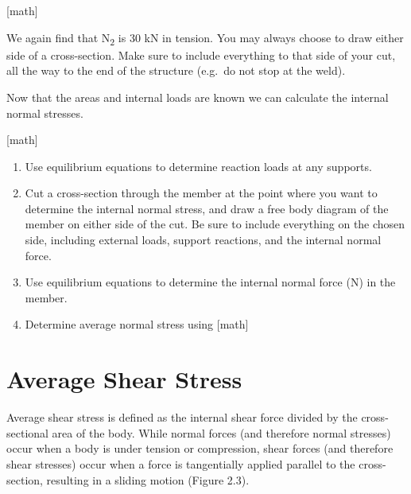 \documentclass[
  letterpaper,
  DIV=11,
  numbers=noendperiod]{scrreprt}
\begin{document}
\begin{tcolorbox}
\begin{tcolorbox}
{[}math{]}

We again find that N\textsubscript{2} is 30 kN in tension. You may
always choose to draw either side of a cross-section. Make sure to
include everything to that side of your cut, all the way to the end of
the structure (e.g.~do not stop at the weld).

Now that the areas and internal loads are known we can calculate the
internal normal stresses.

{[}math{]}

\end{tcolorbox}

\end{tcolorbox}

\begin{tcolorbox}[enhanced jigsaw, colback=white, colframe=quarto-callout-note-color-frame, leftrule=.75mm, opacitybacktitle=0.6, colbacktitle=quarto-callout-note-color!10!white, arc=.35mm, bottomrule=.15mm, breakable, title={Step-by-step: Needs title}, left=2mm, titlerule=0mm, toptitle=1mm, toprule=.15mm, opacityback=0, rightrule=.15mm, coltitle=black, bottomtitle=1mm]

\begin{enumerate}
\def\labelenumi{\arabic{enumi}.}
\item
  Use equilibrium equations to determine reaction loads at any supports.
\item
  Cut a cross-section through the member at the point where you want to
  determine the internal normal stress, and draw a free body diagram of
  the member on either side of the cut. Be sure to include everything on
  the chosen side, including external loads, support reactions, and the
  internal normal force.
\item
  Use equilibrium equations to determine the internal normal force (N)
  in the member.
\item
  Determine average normal stress using {[}math{]}
\end{enumerate}

\end{tcolorbox}

\section{Average Shear Stress}\label{average-shear-stress}

Average shear stress is defined as the internal shear force divided by
the cross-sectional area of the body. While normal forces (and therefore
normal stresses) occur when a body is under tension or compression,
shear forces (and therefore shear stresses) occur when a force is
tangentially applied parallel to the cross-section, resulting in a
sliding motion (Figure 2.3).
\end{document}
